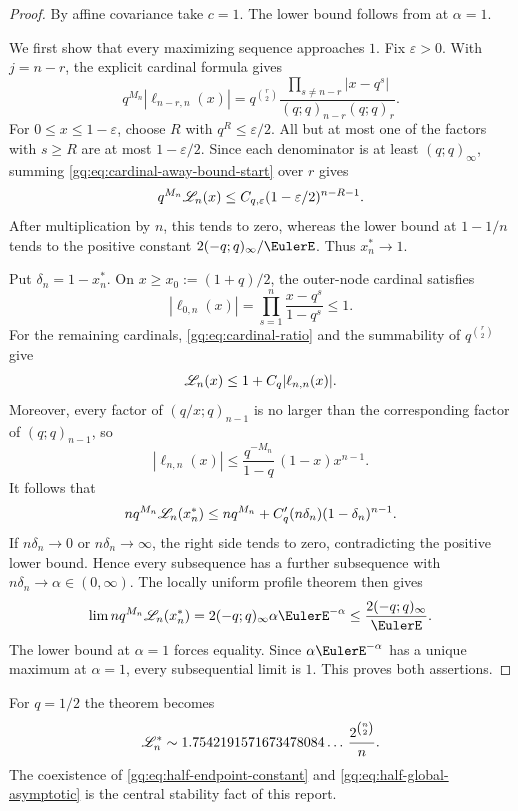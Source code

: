 \begin{proof}
By affine covariance take $c=1$.  The lower bound follows from
 at $\alpha=1$.

We first show that every maximizing sequence approaches $1$.  Fix
$\varepsilon>0$.  With $j=n-r$, the explicit cardinal formula gives
\begin{equation}
 q^{M_n}|\ell_{n-r,n}(x)|
 =q^{\binom r2}
  \frac{\prod_{s\ne n-r}|x-q^s|}
       {(q;q)_{n-r}(q;q)_r}.
 \label{gq:eq:cardinal-away-bound-start}
\end{equation}
For $0\le x\le1-\varepsilon$, choose $R$ with $q^R\le\varepsilon/2$.
All but at most one of the factors with $s\ge R$ are at most
$1-\varepsilon/2$.  Since each denominator is at least
$(q;q)_\infty$, summing \eqref{gq:eq:cardinal-away-bound-start} over $r$ gives
\[
 q^{M_n}\mathscr L_n(x)
 \le C_{q,\varepsilon}(1-\varepsilon/2)^{n-R-1}.
\]
After multiplication by $n$, this tends to zero, whereas the lower bound at
$1-1/n$ tends to the positive constant $2(-q;q)_\infty/\EulerE$.  Thus
$x_n^*\to1$.

Put $\delta_n=1-x_n^*$.  On
$x\ge x_0:=(1+q)/2$, the outer-node cardinal satisfies
\[
 |\ell_{0,n}(x)|
 =\prod_{s=1}^n\frac{x-q^s}{1-q^s}\le1.
\]
For the remaining cardinals, \eqref{gq:eq:cardinal-ratio} and the summability of
$q^{\binom r2}$ give
\[
 \mathscr L_n(x)\le1+C_q|\ell_{n,n}(x)|.
\]
Moreover, every factor of $(q/x;q)_{n-1}$ is no larger than the
corresponding factor of $(q;q)_{n-1}$, so
\begin{equation}
 |\ell_{n,n}(x)|
 \le\frac{q^{-M_n}}{1-q}\,(1-x)x^{n-1}.
 \label{gq:eq:last-cardinal-envelope}
\end{equation}
It follows that
\[
 nq^{M_n}\mathscr L_n(x_n^*)
 \le nq^{M_n}+C'_q(n\delta_n)(1-\delta_n)^{n-1}.
\]
If $n\delta_n\to0$ or $n\delta_n\to\infty$, the right side tends to zero,
contradicting the positive lower bound.  Hence every subsequence has a
further subsequence with $n\delta_n\to\alpha\in(0,\infty)$.  The locally
uniform profile theorem then gives
\[
 \lim nq^{M_n}\Leb_n(x_n^*)
 =2(-q;q)_\infty\alpha\EulerE^{-\alpha}
 \le\frac{2(-q;q)_\infty}{\EulerE}.
\]
The lower bound at $\alpha=1$ forces equality.  Since
$\alpha\EulerE^{-\alpha}$ has a unique maximum at $\alpha=1$, every subsequential
limit is $1$.  This proves both assertions.
\end{proof}

For $q=1/2$ the theorem becomes
\begin{equation}
 \mathscr L_n^*
 \sim 1.7542191571673478084\ldots\,
       \frac{2^{\binom n2}}{n}.
 \label{gq:eq:half-global-asymptotic}
\end{equation}
The coexistence of \eqref{gq:eq:half-endpoint-constant} and
\eqref{gq:eq:half-global-asymptotic} is the central stability fact of this
report.

